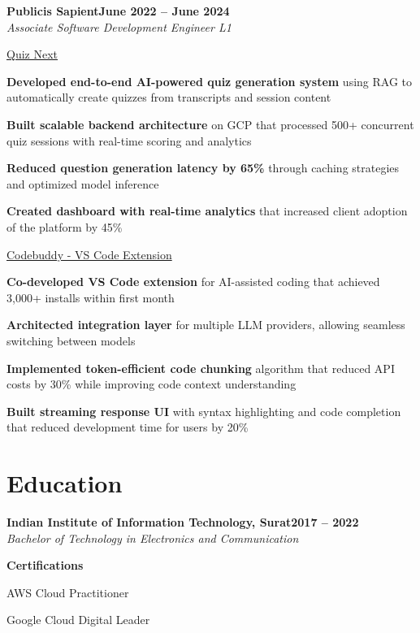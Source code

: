 \documentclass[letterpaper,10pt]{article}
\newcommand{\heading}[2]{
  \hspace{10pt}#1\hfill#2\\
}
\newcommand{\headingBf}[2]{
  \heading{\textbf{#1}}{\textbf{#2}}
}
\newcommand{\headingIt}[2]{
  \heading{\textit{#1}}{\textit{#2}}
}
\newenvironment{resume_list}{
  \vspace{-7pt}
  \begin{itemize}[itemsep=-2px, parsep=1pt, leftmargin=30pt]
}{
  \end{itemize}
}
\newcommand{\itemTitle}[1]{
  \item[] \underline{#1}\vspace{4pt}
}
\begin{document}
  \headingBf{Publicis Sapient}{June 2022 -- June 2024}
  \headingIt{Associate Software Development Engineer L1}{}
  \begin{resume_list}
    \itemTitle{Quiz Next}
    \item \textbf{Developed end-to-end AI-powered quiz generation system} using RAG to automatically create quizzes from transcripts and session content
    \item \textbf{Built scalable backend architecture} on GCP that processed 500+ concurrent quiz sessions with real-time scoring and analytics
    \item \textbf{Reduced question generation latency by 65\%} through caching strategies and optimized model inference
    \item \textbf{Created dashboard with real-time analytics} that increased client adoption of the platform by 45\%
    \vspace{3pt}
    \itemTitle{Codebuddy - VS Code Extension}
    \item \textbf{Co-developed VS Code extension} for AI-assisted coding that achieved 3,000+ installs within first month
    \item \textbf{Architected integration layer} for multiple LLM providers, allowing seamless switching between models
    \item \textbf{Implemented token-efficient code chunking} algorithm that reduced API costs by 30\% while improving code context understanding
    \item \textbf{Built streaming response UI} with syntax highlighting and code completion that reduced development time for users by 20\%
  \end{resume_list}


  \section{Education}

  \headingBf{Indian Institute of Information Technology, Surat}{2017 -- 2022}
  \headingIt{Bachelor of Technology in Electronics and Communication}{}

  \vspace{5pt}
  \headingBf{Certifications}{}
  \begin{resume_list}
    \item AWS Cloud Practitioner
    \item Google Cloud Digital Leader
  \end{resume_list}
\end{document}
